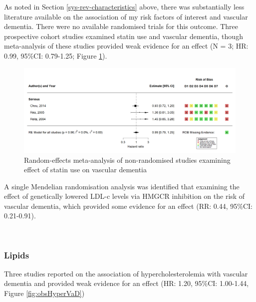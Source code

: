 \documentclass[a4paper, twoside]{templates/ociamthesis}
\begin{document}
As noted in Section \ref{sys-rev-characteristics} above, there was substantially less literature available on the association of my risk factors of interest and vascular dementia. There were no available randomised trials for this outcome. Three prospective cohort studies examined statin use and vascular dementia, though meta-analysis of these studies provided weak evidence for an effect (N = 3; HR: 0.99, 95\%CI: 0.79-1.25; Figure \ref{fig:obsStatinVaDFig}).





\begin{figure}[H]
\includegraphics[width=1\linewidth]{figures/sys-rev/fp_obs_Statin-Ever_VaD} \caption[(ref:obsStatinDVaD-scap)]{Random-effects meta-analysis of non-randomised studies examining effect of statin use on vascular dementia}\label{fig:obsStatinVaDFig}
\end{figure}

A single Mendelian randomisation analysis was identified that examining the effect of genetically lowered LDL-c levels via HMGCR inhibition on the risk of vascular dementia, which provided some evidence for an effect (RR: 0.44, 95\%CI: 0.21-0.91).

~

\hypertarget{lipids-2}{%
\subsubsection{Lipids}\label{lipids-2}}

Three studies reported on the association of hypercholesterolemia with vascular dementia and provided weak evidence for an effect (HR: 1.20, 95\%CI: 1.00-1.44, Figure \ref{fig:obsHyperVaD})
\end{document}

